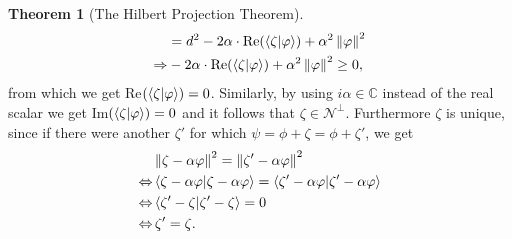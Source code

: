 \documentclass[a4paper,12pt]{wihuri}
\theoremstyle{definition}
\newtheorem{theorem}{Theorem}
\numberwithin{definition}{section}
\numberwithin{example}{section}
\numberwithin{theorem}{section}
\numberwithin{proposition}{section}
\numberwithin{lemma}{section}
\newcommand{\N}{\mathcal{N}}%
\newcommand{\norm}[1]{\left\lVert#1\right\rVert}
\begin{document}
\begin{theorem}[The Hilbert Projection Theorem]
\begin{align*}
&= d^2 - 2\alpha\cdot\text{Re}(\braket{\zeta|\varphi}) + \alpha^2\norm{\varphi}^2 \\
\Rightarrow& -2\alpha\cdot\text{Re}(\braket{\zeta|\varphi}) + \alpha^2\norm{\varphi}^2 \geq 0,
\end{align*}
from which we get Re$(\braket{\zeta|\varphi})=0$. Similarly, by using $i\alpha \in \mathbb{C}$ instead of the real scalar we get Im$(\braket{\zeta|\varphi})=0$ and it follows that $\zeta \in \N^\perp$. Furthermore $\zeta$ is unique, since if there were another $\zeta'$ for which $\psi = \phi + \zeta = \phi + \zeta'$, we get
\begin{align*}
&\norm{\zeta - \alpha\varphi}^2 = \norm{\zeta' - \alpha\varphi}^2\\
\Leftrightarrow & \braket{\zeta - \alpha\varphi | \zeta - \alpha\varphi} = \braket{\zeta' - \alpha\varphi | \zeta' - \alpha\varphi} \\
\Leftrightarrow & \braket{\zeta' - \zeta | \zeta' - \zeta} = 0 \\
\Leftrightarrow &\, \zeta' = \zeta\text.
\end{align*}
\end{theorem}

\end{document}

